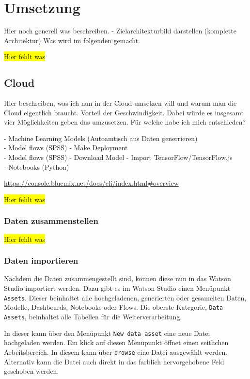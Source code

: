 \section{Umsetzung}
Hier noch generell was beschreiben. - Zielarchitekturbild darstellen (komplette Architektur)
Was wird im folgenden gemacht.

\colorbox{yellow}{Hier fehlt was}

\subsection{Cloud}
Hier beschreiben, was ich nun in der Cloud umsetzen will und warum man die Cloud eigentlich braucht. Vorteil der
Geschwindigkeit. Dabei würde es insgesamt vier Möglichkeiten geben das umzusetzen. Für welche habe ich mich
entschieden?

- Machine Learning Models (Autoamtisch aus Daten generrieren)\\
- Model flows (SPSS) - Make Deployment\\
- Model flows (SPSS) - Download Model - Import TensorFlow/TensorFlow.js\\
- Notebooks (Python)

\url{https://console.bluemix.net/docs/cli/index.html#overview}

\colorbox{yellow}{Hier fehlt was}

\subsubsection{Daten zusammenstellen}
\colorbox{yellow}{Hier fehlt was}

\subsubsection{Daten importieren}
Nachdem die Daten zusammengestellt sind, können diese nun in das Watson Studio importiert werden. Dazu gibt es im Watson
Studio einen Menüpunkt \texttt{Assets}. Dieser beinhaltet alle hochgeladenen, generierten oder gesamelten Daten, Modelle,
Dashboards, Notebooks oder Flows. Die oberste Kategorie, \texttt{Data Assets}, beinhaltet alle Tabellen für die
Weiterverarbeitung.

In dieser kann über den Menüpunkt \texttt{New data asset} eine neue Datei hochgeladen werden. Ein klick auf diesen
Menüpunkt öffnet einen seitlichen Arbeitsbereich. In diesem kann über \texttt{browse} eine Datei ausgewählt werden.
Alternativ kann die Datei auch direkt in das farblich hervorgehobene Feld geschoben werden.

